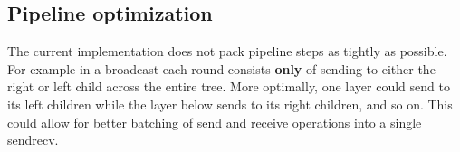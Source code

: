 \documentclass[twoside,twocolumn,hidelinks]{article}
\begin{document}
\subsection{Pipeline optimization}
The current implementation does not pack pipeline steps as tightly as possible. For example in a broadcast each round consists \textbf{only} of sending to either the right or left child across the entire tree. More optimally, one layer could send to its left children while the layer below sends to its right children, and so on. This could allow for better batching of send and receive operations into a single sendrecv. 
  
\printbibliography

\end{document}
